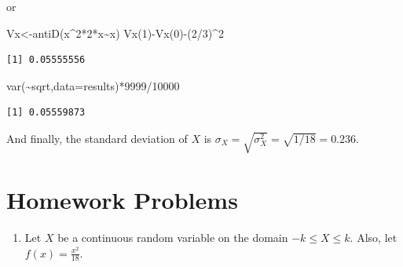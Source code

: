 \documentclass[
  letterpaper,
  DIV=11,
  numbers=noendperiod]{scrreprt}
\newenvironment{Shaded}{\begin{snugshade}}{\end{snugshade}}
\newcommand{\AttributeTok}[1]{\textcolor[rgb]{0.40,0.45,0.13}{#1}}
\newcommand{\DecValTok}[1]{\textcolor[rgb]{0.68,0.00,0.00}{#1}}
\newcommand{\FunctionTok}[1]{\textcolor[rgb]{0.28,0.35,0.67}{#1}}
\newcommand{\NormalTok}[1]{\textcolor[rgb]{0.00,0.23,0.31}{#1}}
\newcommand{\OtherTok}[1]{\textcolor[rgb]{0.00,0.23,0.31}{#1}}
\newcommand{\SpecialCharTok}[1]{\textcolor[rgb]{0.37,0.37,0.37}{#1}}
\providecommand{\tightlist}{%
  \setlength{\itemsep}{0pt}\setlength{\parskip}{0pt}}\usepackage{longtable,booktabs,array}
\begin{document}
or

\begin{Shaded}
\begin{Highlighting}[]
\NormalTok{Vx}\OtherTok{\textless{}{-}}\FunctionTok{antiD}\NormalTok{(x}\SpecialCharTok{\^{}}\DecValTok{2}\SpecialCharTok{*}\DecValTok{2}\SpecialCharTok{*}\NormalTok{x}\SpecialCharTok{\textasciitilde{}}\NormalTok{x)}
\FunctionTok{Vx}\NormalTok{(}\DecValTok{1}\NormalTok{)}\SpecialCharTok{{-}}\FunctionTok{Vx}\NormalTok{(}\DecValTok{0}\NormalTok{)}\SpecialCharTok{{-}}\NormalTok{(}\DecValTok{2}\SpecialCharTok{/}\DecValTok{3}\NormalTok{)}\SpecialCharTok{\^{}}\DecValTok{2}
\end{Highlighting}
\end{Shaded}

\begin{verbatim}
[1] 0.05555556
\end{verbatim}

\begin{Shaded}
\begin{Highlighting}[]
\FunctionTok{var}\NormalTok{(}\SpecialCharTok{\textasciitilde{}}\NormalTok{sqrt,}\AttributeTok{data=}\NormalTok{results)}\SpecialCharTok{*}\DecValTok{9999}\SpecialCharTok{/}\DecValTok{10000}
\end{Highlighting}
\end{Shaded}

\begin{verbatim}
[1] 0.05559873
\end{verbatim}

And finally, the standard deviation of \(X\) is
\(\sigma_X = \sqrt{\sigma^2_X}=\sqrt{1/18}=0.236\).

\section{Homework Problems}\label{homework-problems-10}

\begin{enumerate}
\def\labelenumi{\arabic{enumi}.}
\tightlist
\item
  Let \(X\) be a continuous random variable on the domain
  \(-k \leq X \leq k\). Also, let \(f(x)=\frac{x^2}{18}\).
\end{enumerate}
\end{document}
